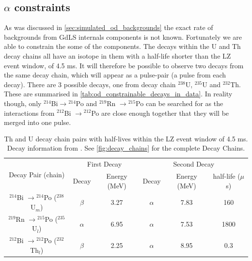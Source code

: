 \subsection{$\alpha$ constraints}
\par
As was discussed in \autoref{sec:simulated_od_backgrounds} the exact rate of backgrounds from GdLS internals components is not known.
Fortunately we are able to constrain the some of the components. 
The decays within the U and Th decay chains all have an isotope in them with a half-life shorter than the LZ event window, of 4.5 ms.
It will therefore be possible to observe two decays from the same decay chain, which will appear as a pulse-pair (a pulse from each decay).
There are 3 possible decays, one from decay chain ${}^{238}$U, ${}^{235}$U and ${}^{232}$Th.
These are summarised in \autoref{tab:od_constrainable_decays_in_data}.
In reality though, only ${}^{214}$Bi$ \to {}^{214}$Po and ${}^{219}$Rn $\to {}^{215}$Po can be searched for as the interactions from ${}^{212}$Bi $\to {}^{212}$Po are close enough together that they will be merged into one pulse.

\begin{table}[!htbp]
    \centering
    \begin{tabular}{c|c|c|c|c|c}
        \multirow{2}{*}{Decay Pair (chain)}                    & \multicolumn{2}{c|}{First Decay}   & \multicolumn{3}{c}{Second Decay}    \\ 
                                                               & Decay    & Energy (MeV) & Decay    & Energy (MeV) & half-life ($\mu$s) \\ \hline
        ${}^{214}$Bi $\to {}^{214}$Po (${}^{238}$U$_{m}$)          & $\beta$  & 3.27         & $\alpha$ & 7.83         & 160   \\ 
        ${}^{219}$Rn $\to {}^{215}$Po (${}^{235}$U$_{l}$)          & $\alpha$ & 6.95         & $\alpha$ & 7.53         & 1800  \\ 
        ${}^{212}$Bi $\to {}^{212}$Po (${}^{232}$Th$_{l}$)         & $\beta$  & 2.25         & $\alpha$ & 8.95         & 0.3
    \end{tabular}
    \caption{Th and U decay chain pairs with half-lives within the LZ event window of 4.5 ms. 
             Decay information from \cite{radon_chains_ref}.
             See \autoref{fig:decay_chains} for the complete Decay Chains.}
    \label{tab:od_constrainable_decays_in_data}
\end{table}

